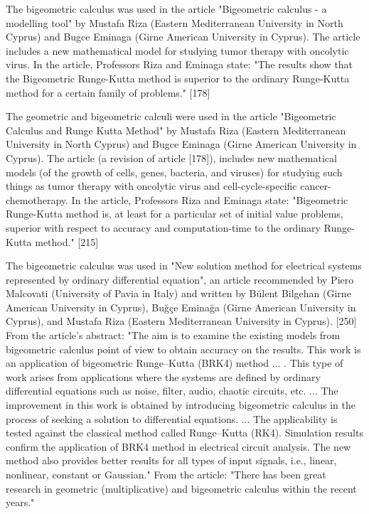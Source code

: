 \documentclass[12pt]{article}
\begin{document}
The bigeometric calculus was used in the article "Bigeometric calculus - a modelling tool" by Mustafa Riza (Eastern Mediterranean University in North Cyprus) and Bugce Eminaga (Girne American University in Cyprus). The article includes a new mathematical model for studying tumor therapy with oncolytic virus. In the article, Professors Riza and Eminaga state: "The results show that the Bigeometric Runge-Kutta method is superior to the ordinary Runge-Kutta method for a certain family of problems." [178]

The geometric and bigeometric calculi were used in the article "Bigeometric Calculus and Runge Kutta Method" by Mustafa Riza (Eastern Mediterranean University in North Cyprus) and Bugce Eminaga (Girne American University in Cyprus). The article (a revision of article [178]), includes new mathematical models (of the growth of cells, genes, bacteria, and viruses) for studying such things as tumor therapy with oncolytic virus and cell-cycle-specific cancer-chemotherapy. In the article, Professors Riza and Eminaga state: "Bigeometric Runge-Kutta method is, at least for a particular set of initial value problems, superior with respect to accuracy and computation-time to the ordinary Runge-Kutta method." [215] 

The bigeometric calculus was used in "New solution method for electrical systems represented by ordinary differential equation", an article recommended by Piero Malcovati (University of Pavia in Italy) and written by Bülent Bilgehan (Girne American University in Cyprus), Buğçe Eminağa (Girne American University in Cyprus), and Mustafa Riza (Eastern Mediterranean University in Cyprus). [250] From the article's abstract: "The aim is to examine the existing models from bigeometric calculus point of view to obtain accuracy on the results. This work is an application of bigeometric Runge–Kutta (BRK4) method ... . This type of work arises from applications where the systems are defined by ordinary differential equations such as noise, filter, audio, chaotic circuits, etc. ... The improvement in this work is obtained by introducing bigeometric calculus in the process of seeking a solution to differential equations. ... The applicability is tested against the classical method called Runge–Kutta (RK4). Simulation results confirm the application of BRK4 method in electrical circuit analysis. The new method also provides better results for all types of input signals, i.e., linear, nonlinear, constant or Gaussian." From the article: "There has been great research in geometric (multiplicative) and bigeometric calculus within the recent years."
\end{document}
